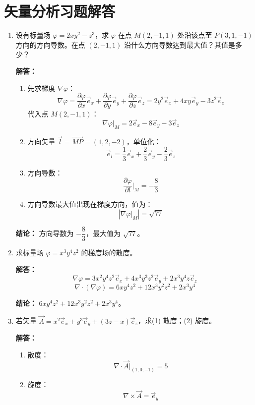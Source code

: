 \section{矢量分析习题解答}

\begin{enumerate}[label=\arabic*.]
\item 设有标量场 $\varphi = 2xy^2 - z^3$，求 $\varphi$ 在点 $M(2,-1,1)$ 处沿该点至 $P(3,1,-1)$ 方向的方向导数。在点 $(2,-1,1)$ 沿什么方向导数达到最大值？其值是多少？

\textbf{解答：}
\begin{enumerate}[label=(\arabic*)]
\item 先求梯度 $\nabla\varphi$：
\[
\nabla\varphi = \frac{\partial\varphi}{\partial x}\vec{e}_x + \frac{\partial\varphi}{\partial y}\vec{e}_y + \frac{\partial\varphi}{\partial z}\vec{e}_z
= 2y^2\vec{e}_x + 4xy\vec{e}_y - 3z^2\vec{e}_z
\]
代入点 $M(2,-1,1)$：
\[
\nabla\varphi\big|_M = 2\vec{e}_x - 8\vec{e}_y - 3\vec{e}_z
\]

\item 方向矢量 $\vec{l} = \overrightarrow{MP} = (1,2,-2)$，单位化：
\[
\vec{e}_l = \frac{1}{3}\vec{e}_x + \frac{2}{3}\vec{e}_y - \frac{2}{3}\vec{e}_z
\]

\item 方向导数：
\[
\frac{\partial\varphi}{\partial l}\bigg|_M = -\frac{8}{3}
\]

\item 方向导数最大值出现在梯度方向，值为：
\[
|\nabla\varphi\big|_M| = \sqrt{77}
\]
\end{enumerate}

\textbf{结论：}
方向导数为 $\boxed{-\dfrac{8}{3}}$，最大值为 $\boxed{\sqrt{77}}$。

\vspace{1em}
\item 求标量场 $\varphi = x^3y^4z^2$ 的梯度场的散度。

\textbf{解答：}
\[
\nabla\varphi = 3x^2y^4z^2\vec{e}_x + 4x^3y^3z^2\vec{e}_y + 2x^3y^4z\vec{e}_z
\]
\[
\nabla\cdot(\nabla\varphi) = 6xy^4z^2 + 12x^3y^2z^2 + 2x^3y^4
\]

\textbf{结论：}
$\boxed{6xy^4z^2 + 12x^3y^2z^2 + 2x^3y^4}$。

\vspace{1em}
\item 若矢量 $\vec{A} = x^2\vec{e}_x + y^3\vec{e}_y + (3z - x)\vec{e}_z$，求(1) 散度；(2) 旋度。

\textbf{解答：}
\begin{enumerate}[label=(\arabic*)]
\item 散度：
\[
\nabla\cdot\vec{A}\big|_{(1,0,-1)} = 5
\]
\item 旋度：
\[
\nabla\times\vec{A} = \vec{e}_y
\]
\end{enumerate}


\end{enumerate}
